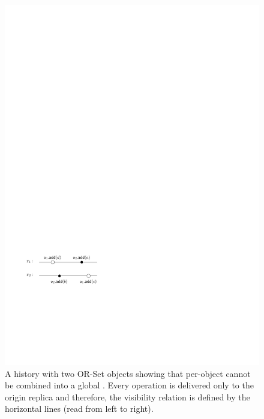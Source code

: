 \begin{figure}[t]
  \centering
  \includegraphics[width=0.35 \textwidth]{figures/TwoSubLin-NotaGlobalLin.pdf}
  \caption{A history with two OR-Set objects showing that per-object  cannot be combined into a global \crdtlinearization{}. Every operation is delivered only to the origin replica and therefore, the visibility relation is defined by the horizontal lines (read from left to right).}
  \label{fig:negative_composition}
\end{figure}

